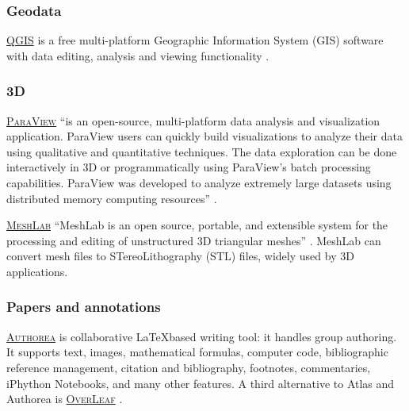\subsubsection{Geodata}

\noindent {} \textsc{\href{http://www.qgis.org/en/site/}{QGIS}} is a free multi-platform Geographic Information System (GIS) software with data editing, analysis and viewing functionality \cite{qgis.org_qgis_2015}.

\subsubsection{3D} 

\noindent {} \textsc{\href{http://www.paraview.org/}{ParaView}}  ``is an open-source, multi-platform data analysis and visualization application. ParaView users can quickly build visualizations to analyze their data using qualitative and quantitative techniques. The data exploration can be done interactively in 3D or programmatically using ParaView’s batch processing capabilities. ParaView was developed to analyze extremely large datasets using distributed memory computing resources'' \cite{paraview.org_paraview_2015}.

\vspace{0.4cm}

\noindent {} \textsc{\href{http://meshlab.sourceforge.net/}{MeshLab}}  ``MeshLab is an open source, portable, and extensible system for the processing and editing of unstructured 3D triangular meshes'' \cite{meshlab.sf.net_meshlab_2015}. MeshLab can convert mesh files to STereoLithography (STL) files, widely used by 3D applications.


\subsubsection{Papers and annotations}

\label{angrpatd}

\noindent {} \textsc{\href{https://www.authorea.com/}{Authorea}} is collaborative \LaTeX based writing tool: it handles group authoring. It supports text, images, mathematical formulas, computer code, bibliographic reference management, citation and bibliography, footnotes, commentaries, iPhython Notebooks, and many other features.   A third alternative to Atlas and Authorea is \textsc{\href{https://www.overleaf.com/}{OverLeaf}} \cite{authorea_authorea:_2015,oreilley_getting-started--atlas_2015}.


